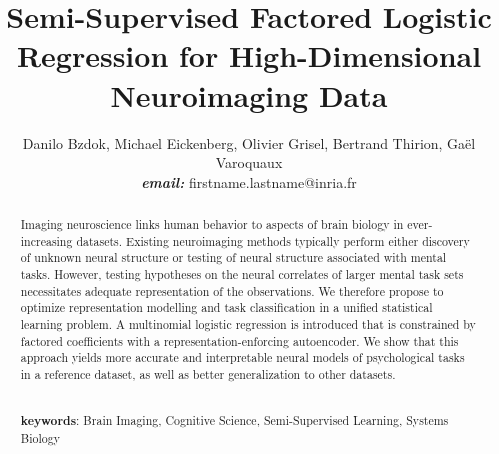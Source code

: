 \documentclass{article} %
\title{Semi-Supervised Factored Logistic Regression for
High-Dimensional Neuroimaging Data}
\begin{document}
\author{Danilo Bzdok, Michael Eickenberg, Olivier Grisel,
  Bertrand Thirion,
  Ga\"el Varoquaux \\\textbf{\textit{email:} }firstname.lastname@inria.fr}

\maketitle

\begin{abstract}
Imaging neuroscience links human behavior to aspects of brain
biology in ever-increasing datasets.
%
Existing neuroimaging methods typically perform either discovery of unknown
neural structure or testing of neural structure associated with mental tasks.
%
However, testing hypotheses on the neural correlates of
larger mental task sets
necessitates adequate representation of the observations.
%
We therefore propose to optimize
representation modelling and task classification in
a unified statistical learning problem.
%
A multinomial logistic regression is introduced that is
constrained by factored coefficients with a representation-enforcing
autoencoder.
%
We show that this approach yields more accurate and interpretable
neural models of psychological tasks in a reference dataset,
as well as better generalization to other datasets.
%


\textbf{\\keywords}: Brain Imaging, Cognitive Science, Semi-Supervised Learning, Systems Biology

\end{abstract}
\end{document}
